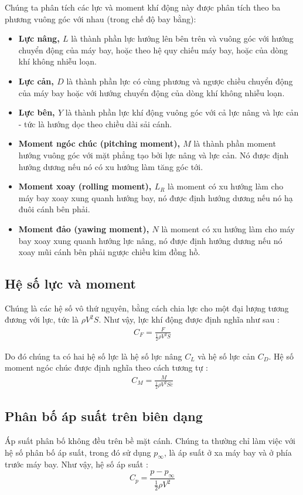 \documentclass[KHI_DONG_HOC.tex]{subfiles}
\begin{document}
Chúng ta phân tích các lực và moment khí động này được phân tích theo ba phương vuông góc với nhau (trong chế độ bay bằng):
\begin{itemize}
	\item \textbf{Lực nâng, $L$} là thành phần lực hướng lên bên trên và vuông góc với hướng chuyển động của máy bay, hoặc theo hệ quy chiếu máy bay, hoặc của dòng khí không nhiễu loạn.
	\item \textbf{Lực cản, $D$} là thành phần lực có cùng phương và ngược chiều chuyển động của máy bay hoặc với hướng chuyển động của dòng khí không nhiễu loạn.
	\item \textbf{Lực bên, $Y$} là thành phần lực khí động vuông góc với cả lực nâng và lực cản - tức là hướng dọc theo chiều dài sải cánh.
	\item \textbf{Moment ngóc chúc (pitching moment), $M$} là thành phần moment hướng vuông góc với mặt phẳng tạo bởi lực nâng và lực cản. Nó được định hướng dương nếu nó có xu hướng làm tăng góc tới.
	\item \textbf{Moment xoay (rolling moment), $L_R$} là moment có xu hướng làm cho máy bay xoay xung quanh hướng bay, nó được định hướng dương nếu nó hạ đuôi cánh bên phải.
	\item \textbf{Moment đảo (yawing moment), $N$} là moment có xu hướng làm cho máy bay xoay xung quanh hướng lực nâng, nó được định hướng dương nếu nó xoay mũi cánh bên phải ngược chiều kim đồng hồ.
\end{itemize}
\subsection{Hệ số lực và moment}
Chúng là các hệ số vô thứ nguyên, bằng cách chia lực cho một đại lượng tương đương với lực, tức là $\rho V^2S$. Như vậy, lực khí động được định nghĩa như sau :
\begin{equation}
	\begin{aligned}
		C_F = \frac{F}{\frac{1}{2}\rho V^2S}
	\end{aligned}
\end{equation}

Do đó chúng ta có hai hệ số lực là hệ số lực nâng $C_L$ và hệ số lực cản $C_D$. Hệ số moment ngóc chúc được định nghĩa theo cách tương tự :
\begin{equation}
	\begin{aligned}
		C_M = \frac{M}{\frac{1}{2}\rho V^2S \overline c}
	\end{aligned}
\end{equation}
\subsection{Phân bố áp suất trên biên dạng}
Áp suất phân bố không đều trên bề mặt cánh. Chúng ta thường chỉ làm việc với hệ số phân bố áp suất, trong đó sử dụng $p_{\infty}$, là áp suất ở xa máy bay và ở phía trước máy bay. Như vậy, hệ số áp suất :
\[{C_p} = \frac{{p - {p_\infty }}}{{\frac{1}{2}\rho {V^2}}}\]
\end{document}
